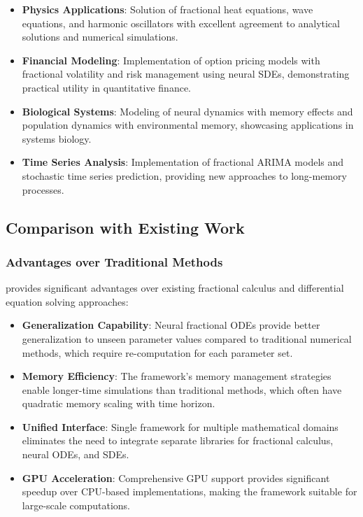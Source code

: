 \begin{itemize}
    \item \textbf{Physics Applications}: Solution of fractional heat equations, wave equations, and harmonic oscillators with excellent agreement to analytical solutions and numerical simulations.
    
    \item \textbf{Financial Modeling}: Implementation of option pricing models with fractional volatility and risk management using neural SDEs, demonstrating practical utility in quantitative finance.
    
    \item \textbf{Biological Systems}: Modeling of neural dynamics with memory effects and population dynamics with environmental memory, showcasing applications in systems biology.
    
    \item \textbf{Time Series Analysis}: Implementation of fractional ARIMA models and stochastic time series prediction, providing new approaches to long-memory processes.
\end{itemize}

\subsection{Comparison with Existing Work}

\subsubsection{Advantages over Traditional Methods}

\hpfracc provides significant advantages over existing fractional calculus and differential equation solving approaches:

\begin{itemize}
    \item \textbf{Generalization Capability}: Neural fractional ODEs provide better generalization to unseen parameter values compared to traditional numerical methods, which require re-computation for each parameter set.
    
    \item \textbf{Memory Efficiency}: The framework's memory management strategies enable longer-time simulations than traditional methods, which often have quadratic memory scaling with time horizon.
    
    \item \textbf{Unified Interface}: Single framework for multiple mathematical domains eliminates the need to integrate separate libraries for fractional calculus, neural ODEs, and SDEs.
    
    \item \textbf{GPU Acceleration}: Comprehensive GPU support provides significant speedup over CPU-based implementations, making the framework suitable for large-scale computations.
\end{itemize}

